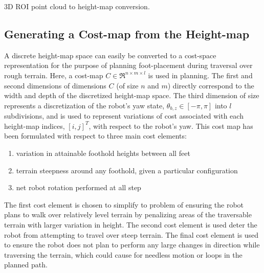 			\begin{algorithm}[!h]
				\begin{algorithmic}
						\EndIf
					\EndFor
				\end{algorithmic}	
				\caption{3D ROI point cloud to height-map conversion.}
				\label{alg::hmconvert}
			\end{algorithm}

		\subsection{Generating a Cost-map from the Height-map}

			A discrete height-map space can easily be converted to a cost-space representation for the purpose of planning foot-placement during traversal over rough terrain. Here, a cost-map $C\in\Re^{n\times m\times l}$ is used in planning. The first and second dimensions of dimensions $C$ (of size $n$ and $m$) directly correspond to the width and depth of the discretized height-map space. The third dimension of size represents a discretization of the robot's yaw state, $\theta_{b,z}\in[-\pi,\pi]$ into $l$ subdivisions, and is used to represent variations of cost associated with each height-map indices, $[i,j]^{T}$, with respect to the robot's yaw. This cost map has been formulated with respect to three main cost elements:
				\begin{enumerate}
					\item variation in attainable foothold heights between all feet
					\item terrain steepness around any foothold, given a particular configuration
					\item net robot rotation performed at all step
				\end{enumerate}
			The first cost element is chosen to simplify to problem of ensuring the robot plans to walk over relatively level terrain by penalizing areas of the traversable terrain with larger variation in height. The second cost element is used deter the robot from attempting to travel over steep terrain. The final cost element is used to ensure the robot does not plan to perform any large changes in direction while traversing the terrain, which could cause for needless motion or loops in the planned path. 


